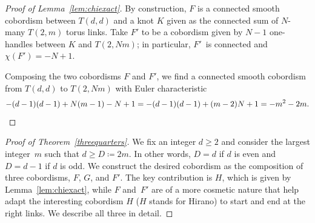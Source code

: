 \documentclass[10pt,a4paper]{article}
\theoremstyle{definition}
\numberwithin{equation}{section}
\begin{document}
\begin{proof}[Proof of Lemma~\ref{lem:chiexact}]
By construction, $F$ is a connected smooth cobordism between $T(d,d)$ and a knot $K$ given as the connected sum of $N$-many $T(2,m)$ torus links. Take $F'$ to be a cobordism given by $N-1$ one-handles between $K$ and $T(2,Nm)$; in particular, $F'$~is connected and $\chi(F')=-N+1$.

Composing the two cobordisms $F$ and $F'$, we find a connected smooth cobordism from $T(d,d)$ to $T(2,Nm)$ with Euler characteristic
\[
-(d-1)(d-1)+N(m-1)-N+1=-(d-1)(d-1)+(m-2)N+1=-m^2-2m.\qedhere
\]
\end{proof}

\begin{proof}[Proof of Theorem~\ref{threequarters}]
We fix an integer $d\geq 2$ and consider the largest integer~$m$ such that $d\geq D\coloneqq 2m$. In other words, $D=d$ if $d$ is even and $D=d-1$ if $d$ is odd. We construct the desired cobordism as the composition of three cobordisms, $F$, $G$, and $F'$. The key contribution is $H$, which is given by Lemma~\ref{lem:chiexact}, while $F$ and~$F'$ are of a more cosmetic nature that help adapt the interesting cobordism $H$ ($H$ stands for Hirano) to start and end at the right links. We describe all three in detail.


\end{proof}
\end{document}
